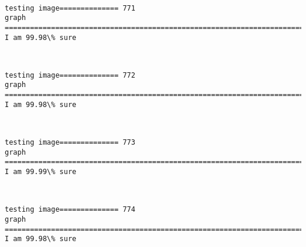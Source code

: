 \documentclass[11pt]{article}
\begin{document}
    \begin{center}
    \end{center}
    { \hspace*{\fill} \\}
    
    \begin{Verbatim}[commandchars=\\\{\}]
testing image============== 771
graph
============================================================================
I am 99.98\% sure

    \end{Verbatim}

    \begin{center}
    \end{center}
    { \hspace*{\fill} \\}
    
    \begin{Verbatim}[commandchars=\\\{\}]
testing image============== 772
graph
============================================================================
I am 99.98\% sure

    \end{Verbatim}

    \begin{center}
    \end{center}
    { \hspace*{\fill} \\}
    
    \begin{Verbatim}[commandchars=\\\{\}]
testing image============== 773
graph
============================================================================
I am 99.99\% sure

    \end{Verbatim}

    \begin{center}
    \end{center}
    { \hspace*{\fill} \\}
    
    \begin{Verbatim}[commandchars=\\\{\}]
testing image============== 774
graph
============================================================================
I am 99.98\% sure

    \end{Verbatim}
\end{document}
